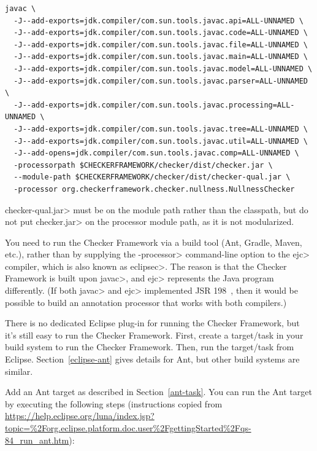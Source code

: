 \begin{Verbatim}
javac \
  -J--add-exports=jdk.compiler/com.sun.tools.javac.api=ALL-UNNAMED \
  -J--add-exports=jdk.compiler/com.sun.tools.javac.code=ALL-UNNAMED \
  -J--add-exports=jdk.compiler/com.sun.tools.javac.file=ALL-UNNAMED \
  -J--add-exports=jdk.compiler/com.sun.tools.javac.main=ALL-UNNAMED \
  -J--add-exports=jdk.compiler/com.sun.tools.javac.model=ALL-UNNAMED \
  -J--add-exports=jdk.compiler/com.sun.tools.javac.parser=ALL-UNNAMED \
  -J--add-exports=jdk.compiler/com.sun.tools.javac.processing=ALL-UNNAMED \
  -J--add-exports=jdk.compiler/com.sun.tools.javac.tree=ALL-UNNAMED \
  -J--add-exports=jdk.compiler/com.sun.tools.javac.util=ALL-UNNAMED \
  -J--add-opens=jdk.compiler/com.sun.tools.javac.comp=ALL-UNNAMED \
  -processorpath $CHECKERFRAMEWORK/checker/dist/checker.jar \
  --module-path $CHECKERFRAMEWORK/checker/dist/checker-qual.jar \
  -processor org.checkerframework.checker.nullness.NullnessChecker
\end{Verbatim}

\<checker-qual.jar> must be on the module path rather than the classpath, but
do not put \<checker.jar> on the processor module path, as it is not
modularized.


\sectionAndLabel{Eclipse}{eclipse}


You
need to run the Checker Framework via a build tool (Ant, Gradle, Maven, etc.), rather
than by supplying the \<-processor> command-line option to the \<ejc>
compiler, which is also known as \<eclipsec>.
The reason is that the Checker Framework is built upon \<javac>,
and \<ejc> represents the Java program differently.  (If both \<javac> and \<ejc>
implemented JSR 198~\cite{JSR198}, then it would be possible to build
an annotation processor that works with both compilers.)


There is no dedicated Eclipse plug-in for running the Checker Framework,
but it's still easy to run the Checker Framework.  First, create a
target/task in your build system to run the Checker Framework.  Then, run
the target/task from Eclipse.  Section~\ref{eclipse-ant} gives details for
Ant, but other build systems are similar.


\subsectionAndLabel{Using an Ant task}{eclipse-ant}

Add an Ant target as described in Section~\ref{ant-task}.  You can
run the Ant target by executing the following steps
(instructions copied from
{\codesize\url{https://help.eclipse.org/luna/index.jsp?topic=%2Forg.eclipse.platform.doc.user%2FgettingStarted%2Fqs-84_run_ant.htm}}):


